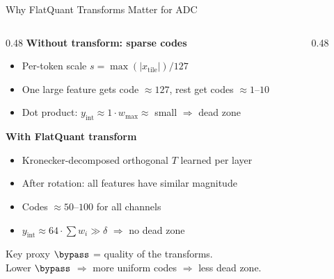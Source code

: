 \begin{frame}[shrink=20]{Why FlatQuant Transforms Matter for ADC}
  \begin{columns}[T]
    \begin{column}{0.48\textwidth}
      \textbf{Without transform: sparse codes}
      \begin{itemize}
        \item Per-token scale $s = \max(|x_\mathrm{tile}|) / 127$
        \item One large feature gets code $\approx\!127$, rest get codes $\approx\!1\text{--}10$
        \item Dot product: $y_\mathrm{int} \approx 1 \cdot w_\mathrm{max} \approx$ small $\Rightarrow$ \alert{dead zone}
      \end{itemize}

      \vspace{0.15em}
      \textbf{With FlatQuant transform}
      \begin{itemize}
        \item Kronecker-decomposed orthogonal $T$ learned per layer
        \item After rotation: all features have similar magnitude
        \item Codes $\approx 50\text{--}100$ for all channels
        \item $y_\mathrm{int} \approx 64 \cdot \sum w_i \gg \delta$ $\Rightarrow$ no dead zone
      \end{itemize}

      \vspace{0.15em}
      \begin{alertblock}{Key proxy}
        $\bypass$ = quality of the transforms.\\
        Lower $\bypass$ $\Rightarrow$ more uniform codes $\Rightarrow$ less dead zone.
      \end{alertblock}
    \end{column}
    \begin{column}{0.48\textwidth}
\end{column}
\end{columns}
\end{frame}
